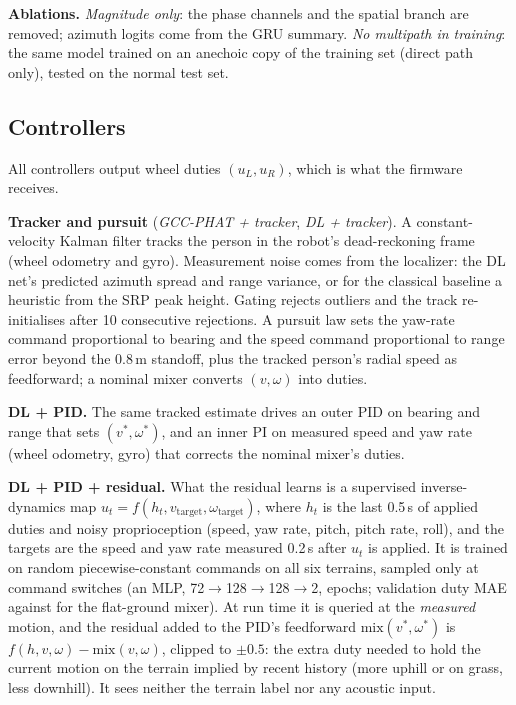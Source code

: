 \textbf{Ablations.} \emph{Magnitude only}: the phase channels and the spatial branch are
removed; azimuth logits come from the GRU summary. \emph{No multipath in training}: the same
model trained on an anechoic copy of the training set (direct path only), tested on the normal
test set.

\subsection{Controllers}

All controllers output wheel duties $(u_L,u_R)$, which is what the firmware receives.

\textbf{Tracker and pursuit} (\emph{GCC-PHAT + tracker}, \emph{DL + tracker}). A constant-velocity
Kalman filter \cite{kalman1960} tracks the person in the robot's dead-reckoning frame (wheel
odometry and gyro). Measurement noise comes from the localizer: the DL net's predicted azimuth
spread and range variance, or for the classical baseline a heuristic from the SRP peak height.
Gating rejects outliers and the track re-initialises after 10 consecutive rejections. A pursuit
law sets the yaw-rate command proportional to bearing and the speed command proportional to
range error beyond the 0.8\,m standoff, plus the tracked person's radial speed as feedforward;
a nominal mixer converts $(v,\omega)$ into duties.

\textbf{DL + PID.} The same tracked estimate drives an outer PID on bearing and range that sets
$(v^*,\omega^*)$, and an inner PI on measured speed and yaw rate (wheel odometry, gyro) that
corrects the nominal mixer's duties.

\textbf{DL + PID + residual.} What the residual learns is a supervised inverse-dynamics map
$u_t = f(h_t, v_{\mathrm{target}}, \omega_{\mathrm{target}})$, where $h_t$ is the last 0.5\,s of
applied duties and noisy proprioception (speed, yaw rate, pitch, pitch rate, roll), and the
targets are the speed and yaw rate measured 0.2\,s after $u_t$ is applied. It is trained on
random piecewise-constant commands on all six terrains, sampled only at command switches (an MLP,
72$\to$128$\to$128$\to$2, \ResEpochs{} epochs; validation duty MAE \ResValMAE{} against
\ResMixerMAE{} for the flat-ground mixer). At run time it is queried at the \emph{measured} motion,
and the residual added to the PID's feedforward $\mathrm{mix}(v^*,\omega^*)$ is
$f(h,v,\omega)-\mathrm{mix}(v,\omega)$, clipped to $\pm0.5$: the extra duty needed to hold the
current motion on the terrain implied by recent history (more uphill or on grass, less downhill).
It sees neither the terrain label nor any acoustic input.

